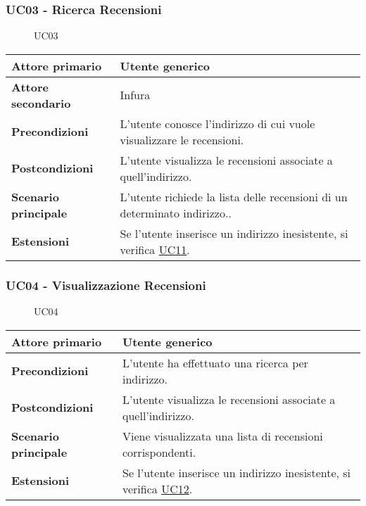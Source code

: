 \subsubsection{UC03 - Ricerca Recensioni}
\label{UC03}

\begin{figure}[H]
    \centering
    
    \caption{UC03}
 \end{figure}

\begin{center}
\renewcommand{\arraystretch}{1.5}
\begin{tabular}{ | m{10em} | m{20em} | }
    \hline
    \textbf{Attore primario} & Utente generico \\
    \hline
    \textbf{Attore secondario} & Infura \\
    \hline
    \textbf{Precondizioni} & L'utente conosce l'indirizzo di cui vuole visualizzare le recensioni. \\
    \hline
    \textbf{Postcondizioni} & L'utente visualizza le recensioni associate a quell'indirizzo. \\
    \hline
    \textbf{Scenario principale} & L'utente richiede la lista delle recensioni di un determinato indirizzo.. \\
    \hline
    \textbf{Estensioni} & Se l'utente inserisce un indirizzo inesistente, si verifica \hyperref[UC11]{UC11}. \\
    \hline
   \end{tabular}
\end{center}

\subsubsection{UC04 - Visualizzazione Recensioni}
\label{UC04}

\begin{figure}[H]
    \centering
    
    \caption{UC04}
 \end{figure}
\begin{center}
\renewcommand{\arraystretch}{1.5}
\begin{tabular}{ | m{10em} | m{20em} | }
    \hline
    \textbf{Attore primario} & Utente generico \\
    \hline
    \textbf{Precondizioni} & L'utente ha effettuato una ricerca per indirizzo. \\
    \hline
    \textbf{Postcondizioni} & L'utente visualizza le recensioni associate a quell'indirizzo. \\
    \hline
    \textbf{Scenario principale} & Viene visualizzata una lista di recensioni corrispondenti. \\
    \hline
    \textbf{Estensioni} & Se l'utente inserisce un indirizzo inesistente, si verifica \hyperref[UC12]{UC12}. \\
    \hline
   \end{tabular}
\end{center}

